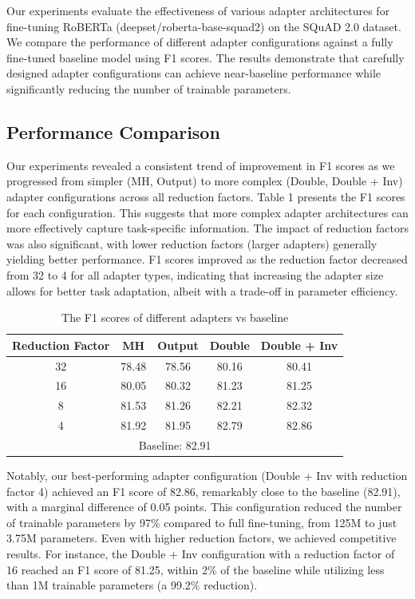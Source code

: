 \documentclass[conference]{IEEEtran}
\begin{document}
Our experiments evaluate the effectiveness of various adapter architectures for fine-tuning RoBERTa (deepset/roberta-base-squad2) on the SQuAD 2.0 dataset. We compare the performance of different adapter configurations against a fully fine-tuned baseline model using F1 scores. The results demonstrate that carefully designed adapter configurations can achieve near-baseline performance while significantly reducing the number of trainable parameters.

\subsection{Performance Comparison}

Our experiments revealed a consistent trend of improvement in F1 scores as we progressed from simpler (MH, Output) to more complex (Double, Double + Inv) adapter configurations across all reduction factors. Table 1
presents the F1 scores for each configuration. This suggests that more complex adapter architectures can more effectively capture task-specific information. The impact of reduction factors was also significant, with lower reduction factors (larger adapters) generally yielding better performance. F1 scores improved as the reduction factor decreased from 32 to 4 for all adapter types, indicating that increasing the adapter size allows for better task adaptation, albeit with a trade-off in parameter efficiency.

\begin{table}[h]
    \caption{The F1 scores of different adapters vs baseline}
    \centering
    \begin{tabular}{|c|c|c|c|c|}
        \hline
        Reduction Factor & MH & Output & Double & Double + Inv \\ \hline
        32 & 78.48 & 78.56 & 80.16 & 80.41 \\ \hline
        16 & 80.05 & 80.32 & 81.23 & 81.25 \\ \hline
        8 & 81.53 & 81.26 & 82.21 & 82.32 \\ \hline
        4 & 81.92 & 81.95 & 82.79 & 82.86 \\ \hline
        \multicolumn{5}{|c|}{Baseline: 82.91} \\ \hline
    \end{tabular}
\end{table}

Notably, our best-performing adapter configuration (Double + Inv with reduction factor 4) achieved an F1 score of 82.86, remarkably close to the baseline (82.91), with a marginal difference of 0.05 points. This configuration reduced the number of trainable parameters by 97\% compared to full fine-tuning, from 125M to just 3.75M parameters. Even with higher reduction factors, we achieved competitive results. For instance, the Double + Inv configuration with a reduction factor of 16 reached an F1 score of 81.25, within 2\% of the baseline while utilizing less than 1M trainable parameters (a 99.2\% reduction).
\end{document}
